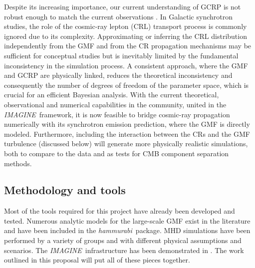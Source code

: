 \documentclass[12pt]{article}
\newcommand{\imagine}{\textsl{IMAGINE}}
\newcommand{\imagineSW}{\textsl{IMAGINE}}
\newcommand{\hammurabi}{\textsl{hammurabi}}
\newcommand{\todo}[1]{\textcolor{red}{#1}}
\begin{document}
Despite its increasing importance, our current understanding of GCRP is not robust enough to match the current observations \citep{Cui2017}.
In Galactic synchrotron studies, the role of the cosmic-ray lepton (CRL) transport process is commonly ignored due to its complexity.
Approximating or inferring the CRL distribution independently from the GMF and from the CR propagation mechanisms may be sufficient for conceptual studies but is inevitably limited by the fundamental inconsistency in the simulation process.  
A consistent approach, where the GMF and GCRP are physically linked, reduces the  theoretical inconsistency and consequently the number of degrees of freedom of the parameter space, which is crucial for an efficient Bayesian analysis.
With the current theoretical, observational and numerical capabilities in the community, united in the \imagine\ framework, it is now feasible to bridge cosmic-ray propagation numerically with its synchrotron emission prediction, where the GMF is directly modeled.  Furthermore, including the interaction between the CRs and the GMF turbulence (discussed below) will generate more physically realistic simulations, both to compare to the data and as tests for CMB component separation methods. 




\subsection*{Methodology and tools}

Most of the tools required for this project have already been developed and tested. Numerous analytic models for the large-scale GMF exist in the literature and have been included in the \hammurabi\ package. MHD simulations have been performed by a variety of groups and with different physical assumptions and scenarios.  The \imagineSW\ infrastructure has been demonstrated in \cite{steininger:2018}.  The work outlined in this proposal will put all of these pieces together.  
\end{document}
